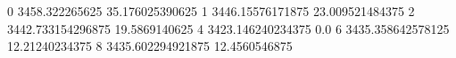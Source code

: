 0 3458.322265625 35.176025390625
1 3446.15576171875 23.009521484375
2 3442.733154296875 19.5869140625
4 3423.146240234375 0.0
6 3435.358642578125 12.21240234375
8 3435.602294921875 12.4560546875

